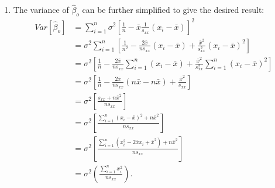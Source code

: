 \begin{problem}{24}
\begin{enumerate}
\item The variance of $\hat \beta_o$ can be further simplified to give the desired result:
\begin{align*}
Var[\hat \beta_o] & = \sum_{i=1}^n \sigma^2 \left[\frac{1}{n} -\bar x \frac{1}{s_{xx}} (x_i-\bar x)\right ]^2 \\
& =\sigma^2 \sum_{i=1}^n \left [ \frac{1}{n^2}-\frac{2 \bar x}{n s_{xx}}(x_i -\bar x) +\frac{\bar x^2}{s_{xx}^2}(x_i-\bar x)^2 \right] \\
& =\sigma^2 \left [ \frac{1}{n}-\frac{2 \bar x}{n s_{xx}} \sum_{i=1}^n (x_i -\bar x) +\frac{\bar x^2}{s_{xx}^2} \sum_{i=1}^n(x_i-\bar x)^2 \right] \\
& = \sigma^2 \left [ \frac{1}{n}-\frac{2 \bar x}{n s_{xx}} (n \bar x -n\bar x) +\frac{\bar x^2}{s_{xx}} \right] \\
& = \sigma^2 \left [ \frac{s_{xx} +n \bar x^2}{n s_{xx}} \right] \\
& = \sigma^2 \left [ \frac{\sum_{i=1}^n (x_i -\bar x)^2 +n \bar x^2}{n s_{xx}} \right] \\
& = \sigma^2 \left [ \frac{\sum_{i=1}^n (x_i^2-2\bar x x_i+\bar x^2) +n \bar x^2}{n s_{xx}} \right] \\
& = \sigma^2 \left ( \frac{\sum_{i=1}^n x_i^2}{n s_{xx}} \right).
\end{align*}

\end{enumerate}

\end{problem}




